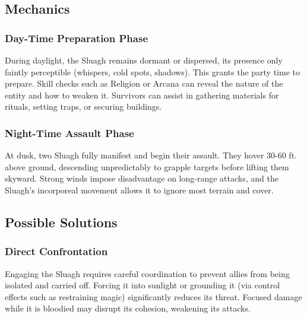 \subsection*{Mechanics}
\subsubsection*{Day-Time Preparation Phase}
{\entryfont During daylight, the Sluagh remains dormant or dispersed, its presence only faintly perceptible (whispers, cold spots, shadows). This grants the party time to prepare. Skill checks such as Religion or Arcana can reveal the nature of the entity and how to weaken it. Survivors can assist in gathering materials for rituals, setting traps, or securing buildings.}
\subsubsection*{Night-Time Assault Phase}
{\entryfont At dusk, two Sluagh fully manifest and begin their assault. They hover 30-60 ft. above ground, descending unpredictably to grapple targets before lifting them skyward. Strong winds impose disadvantage on long-range attacks, and the Sluagh's incorporeal movement allows it to ignore most terrain and cover.}

\subsection*{Possible Solutions}
\subsubsection*{Direct Confrontation}
{\entryfont Engaging the Sluagh requires careful coordination to prevent allies from being isolated and carried off. Forcing it into sunlight or grounding it (via control effects such as restraining magic) significantly reduces its threat. Focused damage while it is bloodied may disrupt its cohesion, weakening its attacks.}
